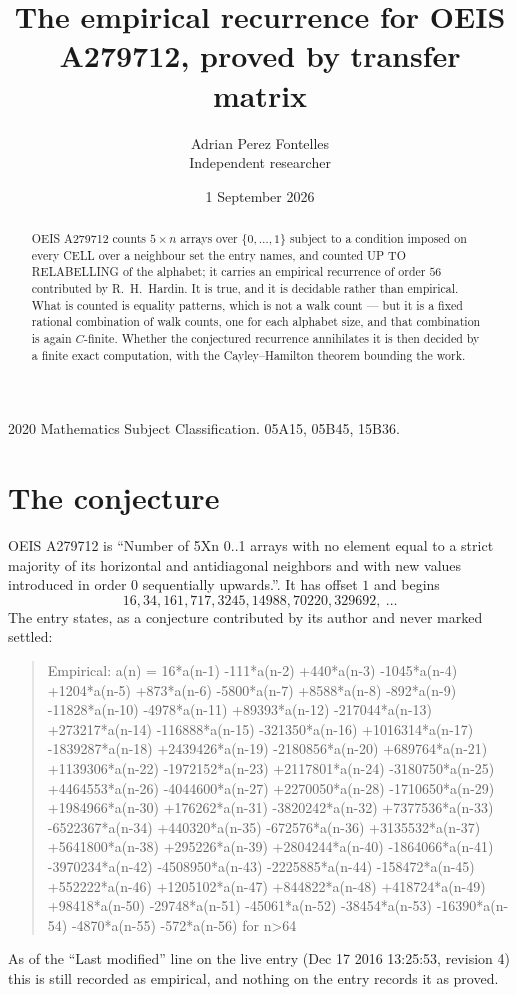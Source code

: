 \documentclass[11pt,a4paper]{article}
\title{The empirical recurrence for OEIS A279712, proved by transfer matrix}
\author{Adrian Perez Fontelles\\ \small Independent researcher}
\date{1 September 2026}
\theoremstyle{plain}
\theoremstyle{definition}
\begin{document}
\maketitle

\begin{abstract}
OEIS A279712 counts $5\times n$ arrays over $\{0,\dots,1\}$ subject to a condition imposed on
every CELL over a neighbour set the entry names, and counted UP TO RELABELLING of the
alphabet; it carries an empirical recurrence of order $56$ contributed by
R.~H.~Hardin. It is true, and it is decidable rather than empirical. What is counted is
equality patterns, which is not a walk count --- but it is a fixed rational combination of
walk counts, one for each alphabet size, and that combination is again $C$-finite. Whether the
conjectured recurrence annihilates it is then decided by a finite exact computation, with the
Cayley--Hamilton theorem bounding the work.
\end{abstract}

\noindent\small 2020 Mathematics Subject Classification. 05A15, 05B45, 15B36.\normalsize

\section{The conjecture}

OEIS A279712 is ``Number of 5Xn 0..1 arrays with no element equal to a strict majority of its horizontal and antidiagonal neighbors and with new values introduced in order 0 sequentially upwards.''. It has offset $1$ and begins
\[
16, 34, 161, 717, 3245, 14988, 70220, 329692,\ \dots
\]
The entry states, as a conjecture contributed by its author and never marked settled:
\begin{quote}
Empirical: a(n) = 16*a(n-1) -111*a(n-2) +440*a(n-3) -1045*a(n-4) +1204*a(n-5) +873*a(n-6) -5800*a(n-7) +8588*a(n-8) -892*a(n-9) -11828*a(n-10) -4978*a(n-11) +89393*a(n-12) -217044*a(n-13) +273217*a(n-14) -116888*a(n-15) -321350*a(n-16) +1016314*a(n-17) -1839287*a(n-18) +2439426*a(n-19) -2180856*a(n-20) +689764*a(n-21) +1139306*a(n-22) -1972152*a(n-23) +2117801*a(n-24) -3180750*a(n-25) +4464553*a(n-26) -4044600*a(n-27) +2270050*a(n-28) -1710650*a(n-29) +1984966*a(n-30) +176262*a(n-31) -3820242*a(n-32) +7377536*a(n-33) -6522367*a(n-34) +440320*a(n-35) -672576*a(n-36) +3135532*a(n-37) +5641800*a(n-38) +295226*a(n-39) +2804244*a(n-40) -1864066*a(n-41) -3970234*a(n-42) -4508950*a(n-43) -2225885*a(n-44) -158472*a(n-45) +552222*a(n-46) +1205102*a(n-47) +844822*a(n-48) +418724*a(n-49) +98418*a(n-50) -29748*a(n-51) -45061*a(n-52) -38454*a(n-53) -16390*a(n-54) -4870*a(n-55) -572*a(n-56) for n>64
\end{quote}
As of the ``Last modified'' line on the live entry (Dec 17 2016 13:25:53, revision 4) this is still
recorded as empirical, and nothing on the entry records it as proved.
\end{document}
